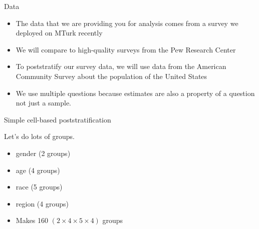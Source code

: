 \documentclass[aspectratio=169]{beamer}
\begin{document}
\begin{frame}{Data}

\begin{itemize}
\item The data that we are providing you for analysis comes from a survey we deployed on MTurk recently
\pause
\item We will compare to high-quality surveys from the Pew Research Center 
\pause
\item To poststratify our survey data, we will use data from the American Community Survey about the population of the United States
\pause
\item We use multiple questions because estimates are also a property of a question not just a sample.
\end{itemize}

\end{frame}
%
%
%
%
\begin{frame}{Simple cell-based poststratification}

Let's do lots of groups.
\begin{itemize}
\item gender (2 groups)
\item age (4 groups)
\item race (5 groups)
\item region (4 groups)
\item Makes 160 $(2 \times 4 \times 5 \times 4)$ groups
\end{itemize}

\end{frame}
\end{document}
